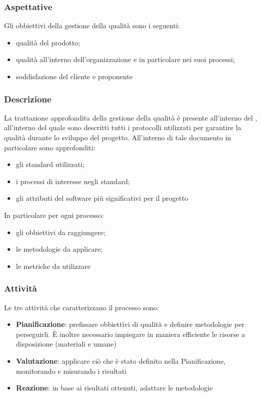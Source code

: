 		\subsubsection{Aspettative}
		Gli obbiettivi della gestione della qualità sono i seguenti:
		\begin{itemize}
			\item qualità del prodotto;
			\item qualità all'interno dell'organizzazione e in particolare nei suoi processi;
			\item soddisfazione del cliente e proponente
		\end{itemize}
		
		\subsubsection{Descrizione}
		La trattazione approfondita della gestione della qualità è presente all'interno del \PdQ, all'interno del quale sono descritti tutti i protocolli utilizzati per garantire la qualità durante lo sviluppo del progetto. All'interno di tale documento in particolare sono approfonditi:
		\begin{itemize}
			\item gli standard utilizzati;
			\item i processi di interesse negli standard;
			\item gli attributi del software più significativi per il progetto
		\end{itemize}
		In particolare per ogni processo:
		\begin{itemize}
			\item gli obbiettivi da raggiungere;
			\item le metodologie da applicare;
			\item le metriche da utilizzare
		\end{itemize}
		
		\subsubsection{Attività}
		Le tre attività che caratterizzano il processo sono:
		\begin{itemize}
			\item \textbf{Pianificazione}: prefissare obbiettivi di qualità e definire metodologie per perseguirli. È inoltre necessario impiegare in maniera efficiente le risorse a disposizione (materiali e umane)
			\item \textbf{Valutazione}: applicare ciò che è stato definito nella Pianificazione, monitorando e misurando i risultati
			\item \textbf{Reazione}: in base ai risultati ottenuti, adattare le metodologie
		\end{itemize}
		
